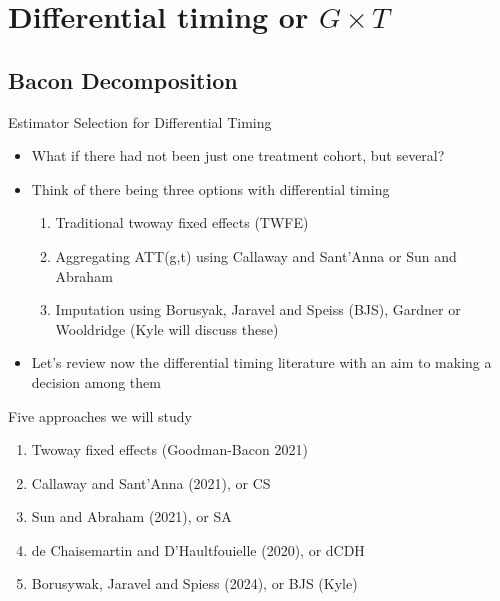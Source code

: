 \documentclass{beamer}
\begin{document}






\section{Differential timing or $G \times T$} 

\subsection{Bacon Decomposition}

\begin{frame}{Estimator Selection for Differential Timing}

\begin{itemize}
\item What if there had not been just one treatment cohort, but several? 
\item Think of there being three options with differential timing 
	\begin{enumerate}
	\item Traditional twoway fixed effects (TWFE)
	\item Aggregating ATT(g,t) using Callaway and Sant'Anna or Sun and Abraham
	\item Imputation using Borusyak, Jaravel and Speiss (BJS), Gardner or Wooldridge (Kyle will discuss these)
	\end{enumerate}
\item  Let's review now the differential timing literature with an aim to making a decision among them
\end{itemize}

\end{frame}

\begin{frame}{Five approaches we will study}

\begin{enumerate}
\item Twoway fixed effects (Goodman-Bacon 2021)
\item Callaway and Sant'Anna (2021), or CS
\item Sun and Abraham (2021), or SA
\item de Chaisemartin and D'Haultfouielle (2020), or dCDH
\item Borusywak, Jaravel and Spiess (2024), or BJS (Kyle)
\end{enumerate}
\end{frame}
\end{document}
